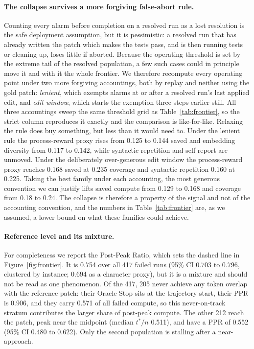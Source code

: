 \documentclass[sigconf,screen]{acmart}
\begin{document}
\paragraph{The collapse survives a more forgiving false-abort rule.} Counting every alarm before
completion on a resolved run as a lost resolution is the safe deployment assumption, but it is
pessimistic: a resolved run that has already written the patch which makes the tests pass, and is
then running tests or cleaning up, loses little if aborted. Because the operating threshold is set
by the extreme tail of the resolved population, a few such cases could in principle move it and with
it the whole frontier. We therefore recompute every operating point under two more forgiving
accountings, both by replay and neither using the gold patch: \emph{lenient}, which exempts alarms
at or after a resolved run's last applied edit, and \emph{edit window}, which starts the exemption
three steps earlier still. All three accountings sweep the same threshold grid as
Table~\ref{tab:frontier}, so the strict column reproduces it exactly and the comparison is
like-for-like. Relaxing the rule does buy something, but less than it would need to. Under the
lenient rule the process-reward proxy rises from 0.125 to 0.144 saved and embedding diversity from
0.117 to 0.142, while syntactic repetition and self-report are unmoved. Under the deliberately
over-generous edit window the process-reward proxy reaches 0.168 saved at 0.235 coverage and
syntactic repetition 0.160 at 0.225. Taking the best family under each accounting, the most
generous convention we can justify lifts saved compute from 0.129 to 0.168 and coverage from 0.18
to 0.24. The collapse is therefore a
property of the signal and not of the accounting convention, and the numbers in
Table~\ref{tab:frontier} are, as we assumed, a lower bound on what these families could achieve.

\paragraph{Reference level and its mixture.} For completeness we report the Post-Peak Ratio, which
sets the dashed line in Figure~\ref{fig:frontier}. It is 0.754 over all 417 failed runs (95\% CI
0.703 to 0.796, clustered by instance; 0.694 as a character proxy), but it is a mixture and should
not be read as one phenomenon. Of the 417, 205 never achieve any token overlap with the reference
patch: their Oracle Stop sits at the trajectory start, their PPR is 0.906, and they carry 0.571 of
all failed compute, so this never-on-track stratum contributes the larger share of post-peak
compute. The other 212 reach the patch, peak near the midpoint (median $t^{*}/n$ 0.511),
and have a PPR of 0.552 (95\% CI 0.480 to 0.622). Only the second population is stalling after a
near-approach.
\end{document}
